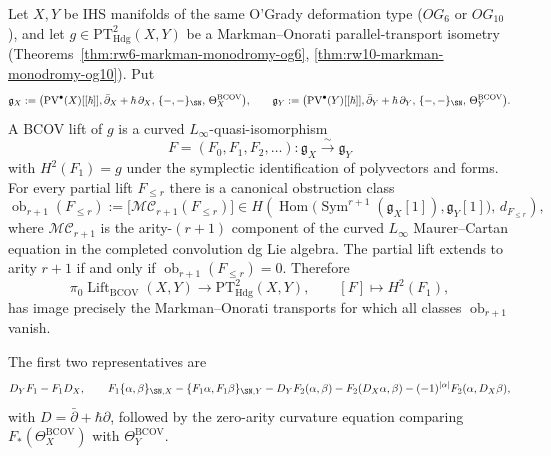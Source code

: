\begin{theorem}
\label{thm:chain-level-markman-og}
Let $X, Y$ be IHS manifolds of the same O'Grady deformation
type \textup{(}$OG_6$ or $OG_{10}$\textup{),} and let
$g\in\mathrm{PT}^2_{\mathrm{Hdg}}(X,Y)$ be a Markman--Onorati
parallel-transport isometry
\textup{(}Theorems~\ref{thm:rw6-markman-monodromy-og6},
\ref{thm:rw10-markman-monodromy-og10}\textup{).}
Put
\[
 \mathfrak g_X :=
 \bigl(\mathrm{PV}^\bullet(X)[[\hbar]],
 \bar\partial_X + \hbar\, \partial_X,\,
 \{-,-\}_{\SN},\,
 \Theta^{\mathrm{BCOV}}_X\bigr),
 \qquad
 \mathfrak g_Y :=
 \bigl(\mathrm{PV}^\bullet(Y)[[\hbar]],
 \bar\partial_Y + \hbar\, \partial_Y,\,
 \{-,-\}_{\SN},\,
 \Theta^{\mathrm{BCOV}}_Y\bigr).
\]
A BCOV lift of \(g\) is a curved \(L_\infty\)-quasi-isomorphism
\[
 F=(F_0,F_1,F_2,\ldots):\mathfrak g_X\xrightarrow{\sim}\mathfrak g_Y
\]
with \(H^2(F_1)=g\) under the symplectic identification of polyvectors
and forms. For every partial lift \(F_{\le r}\) there is a canonical
obstruction class
\[
 \operatorname{ob}_{r+1}(F_{\le r})
 :=
 \bigl[\mathcal{MC}_{r+1}(F_{\le r})\bigr]
 \in
 H\!\left(
 \operatorname{Hom}\bigl(\operatorname{Sym}^{r+1}(\mathfrak g_X[1]),
 \mathfrak g_Y[1]\bigr),\,d_{F_{\le r}}
 \right),
\]
where \(\mathcal{MC}_{r+1}\) is the arity-\((r+1)\) component of the
curved \(L_\infty\) Maurer--Cartan equation in the completed
convolution dg Lie algebra. The partial lift extends to arity \(r+1\)
if and only if \(\operatorname{ob}_{r+1}(F_{\le r})=0\). Therefore
\[
 \pi_0\operatorname{Lift}_{\mathrm{BCOV}}(X,Y)
 \longrightarrow
 \mathrm{PT}^2_{\mathrm{Hdg}}(X,Y),
 \qquad
 [F]\longmapsto H^2(F_1),
\]
has image precisely the Markman--Onorati transports for which all
classes \(\operatorname{ob}_{r+1}\) vanish.

The first two representatives are
\[
 D_YF_1-F_1D_X,\qquad
 F_1\{\alpha,\beta\}_{\SN,X}
 -\{F_1\alpha,F_1\beta\}_{\SN,Y}
 -D_YF_2(\alpha,\beta)
 -F_2(D_X\alpha,\beta)
 -(-1)^{|\alpha|}F_2(\alpha,D_X\beta),
\]
with \(D=\bar\partial+\hbar\partial\), followed by the zero-arity
curvature equation comparing \(F_*(\Theta_X^{\mathrm{BCOV}})\) with
\(\Theta_Y^{\mathrm{BCOV}}\).
\end{theorem}

